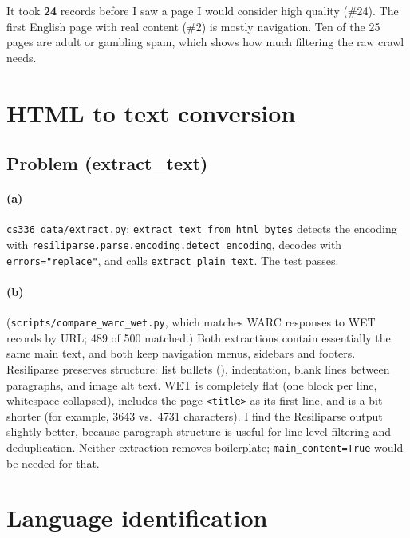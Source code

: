 \documentclass[11pt]{article}
\begin{document}
\noindent It took \textbf{24} records before I saw a page I would consider high quality (\#24).
The first English page with real content (\#2) is mostly navigation. Ten of the 25 pages are
adult or gambling spam, which shows how much filtering the raw crawl needs.

\section{HTML to text conversion}

\subsection*{Problem (extract\_text)}

\paragraph{(a)} \texttt{cs336\_data/extract.py}: \texttt{extract\_text\_from\_html\_bytes} detects the
encoding with \texttt{resiliparse.parse.encoding.detect\_encoding}, decodes with
\texttt{errors="replace"}, and calls \texttt{extract\_plain\_text}. The test passes.

\paragraph{(b)} (\texttt{scripts/compare\_warc\_wet.py}, which matches WARC responses to WET
records by URL; 489 of 500 matched.) Both extractions contain essentially the same main
text, and both keep navigation menus, sidebars and footers. Resiliparse preserves structure:
list bullets (\texttt{\textbullet}), indentation, blank lines between paragraphs, and image
alt text. WET is completely flat (one block per line, whitespace collapsed), includes the
page \texttt{<title>} as its first line, and is a bit shorter (for example, 3643 vs.\ 4731 characters).
I find the Resiliparse output slightly better, because paragraph structure is useful for
line-level filtering and deduplication. Neither extraction removes boilerplate;
\texttt{main\_content=True} would be needed for that.

\section{Language identification}
\end{document}
